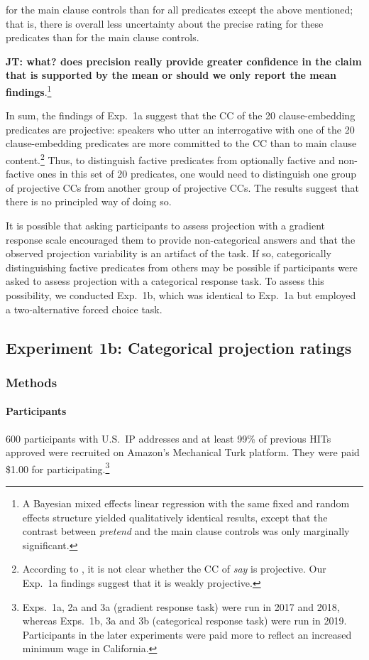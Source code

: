 \documentclass[11pt,fleqn]{article}
\newcommand{\6}{\mbox{$[\hspace*{-.6mm}[$}}
\newcommand{\9}{\mbox{$]\hspace*{-.6mm}]$}}
\newcommand{\jt}[1]{\textbf{\color{blue}JT: #1}}
\begin{document}
for the main clause controls than for all predicates except the above mentioned; that is, there is overall less uncertainty about the precise rating for these predicates than for the main clause controls.

 \jt{what? does precision really provide greater confidence in the claim that is supported by the mean or should we only report the mean findings}.\footnote{A Bayesian mixed effects linear regression with the same fixed and random effects structure yielded qualitatively identical results, except that the contrast between \emph{pretend} and the main clause controls was only marginally significant.}  

In sum, the findings of Exp.~1a suggest that the CC of the 20 clause-embedding predicates are projective: speakers who utter an interrogative with one of the 20 clause-embedding predicates are more committed to the CC than to main clause content.\footnote{According to \citet[1739]{spector-egre2015}, it is not clear whether the CC of {\em say} is projective. Our Exp.~1a findings suggest that it is weakly projective.}    Thus, to distinguish factive predicates from optionally factive and non-factive ones in this set of 20 predicates, one would need to distinguish one group of projective CCs from another group of projective CCs. The results suggest that there is no principled way of doing so.

It is possible that asking participants to assess projection with a gradient response scale encouraged them to provide non-categorical answers and that the observed projection variability is an artifact of the task. If so, categorically distinguishing factive predicates from others may be possible if participants were asked to assess projection with a categorical response task. To assess this possibility, we conducted Exp.~1b, which was identical to Exp.~1a but employed a two-alternative forced choice task.

\subsection{Experiment 1b: Categorical projection ratings}

\subsubsection{Methods}

\paragraph{Participants} 600 participants with U.S.\ IP addresses and at least 99\% of previous HITs approved were recruited on Amazon's Mechanical Turk platform. They were paid \$1.00 for participating.\footnote{Exps.~1a, 2a and 3a (gradient response task) were run in 2017 and 2018, whereas  Exps.~1b, 3a and 3b (categorical response task) were run in 2019. Participants in the later experiments were paid more to reflect an increased minimum wage in California.}
\end{document}

